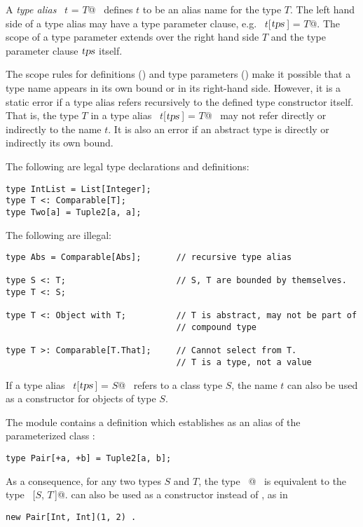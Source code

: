 \documentclass[a4paper,12pt,twoside,titlepage]{book}
\newcommand{\tps}{\mbox{\sl tps}}
\begin{document}
A {\em type alias} ~\lstinline@type $t$ = $T$@~ defines $t$ to be an alias
name for the type $T$.  The left hand side of a type alias may
have a type parameter clause, e.g. ~\lstinline@type $t$[$\tps\,$] = $T$@.  The scope
of a type parameter extends over the right hand side $T$ and the
type parameter clause $\tps$ itself.  

The scope rules for definitions () and type parameters
() make it possible that a type name appears in its
own bound or in its right-hand side.  However, it is a static error if
a type alias refers recursively to the defined type constructor itself.  
That is, the type $T$ in a type alias ~\lstinline@type $t$[$\tps\,$] = $T$@~ may not refer
directly or indirectly to the name $t$.  It is also an error if
an abstract type is directly or indirectly its own bound.

\example The following are legal type declarations and definitions:
\begin{lstlisting}
type IntList = List[Integer];
type T <: Comparable[T];
type Two[a] = Tuple2[a, a];
\end{lstlisting}

The following are illegal:
\begin{lstlisting}
type Abs = Comparable[Abs];       // recursive type alias

type S <: T;                      // S, T are bounded by themselves.
type T <: S;

type T <: Object with T;          // T is abstract, may not be part of
                                  // compound type

type T >: Comparable[T.That];     // Cannot select from T.
                                  // T is a type, not a value
\end{lstlisting}

If a type alias ~\lstinline@type $t$[$\tps\,$] = $S$@~ refers to a class type
$S$, the name $t$ can also be used as a constructor for
objects of type $S$.

\example The  module contains a definition which establishes  
as an alias of the parameterized class :
\begin{lstlisting}
type Pair[+a, +b] = Tuple2[a, b];
\end{lstlisting}
As a consequence, for any two types $S$ and $T$, the type
~\lstinline@Pair[$S$, $T\,$]@~ is equivalent to the type ~[$S$, $T\,$]@.
 can also be used as a constructor instead of , as in
\begin{lstlisting}
new Pair[Int, Int](1, 2) .
\end{lstlisting}
\end{document}
